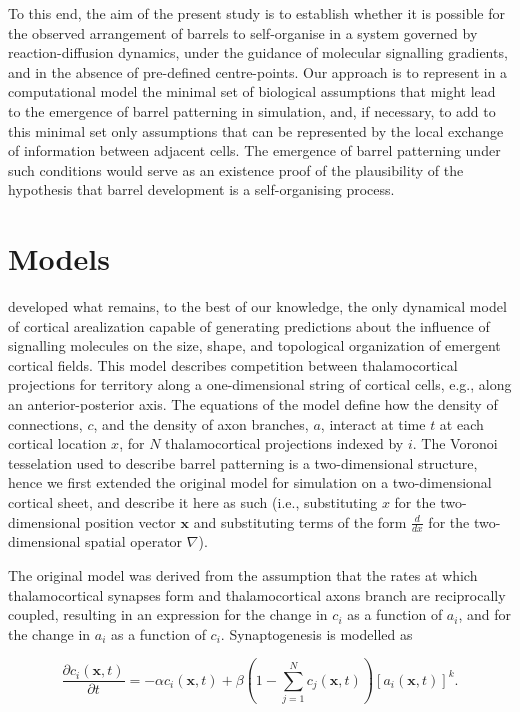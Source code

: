 \documentclass[a4paper,11pt]{article}
\newcommand{\mb}[1]{\mathbf{#1}}
\begin{document}
To this end, the aim of the present study is to establish whether it is possible for the observed arrangement of barrels to self-organise in a system governed by reaction-diffusion dynamics, under the guidance of molecular signalling gradients, and in the absence of pre-defined centre-points. Our approach is to represent in a computational model the minimal set of biological assumptions that might lead to the emergence of barrel patterning in simulation, and, if necessary, to add to this minimal set only assumptions that can be represented by the local exchange of information between adjacent cells. The emergence of barrel patterning under such conditions would serve as an existence proof of the plausibility of the hypothesis that barrel development is a self-organising process.

\section*{Models}

\cite{Karbowski2004} developed what remains, to the best of our knowledge, the only dynamical model of cortical arealization capable of generating predictions about the influence of signalling molecules on the size, shape, and topological organization of emergent cortical fields. This model describes competition between thalamocortical projections for territory along a one-dimensional string of cortical cells, e.g., along an anterior-posterior axis. The equations of the model define how the density of connections, $c$, and the density of axon branches, $a$, interact at time $t$ at each cortical location $x$, for $N$ thalamocortical projections indexed by $i$. The Voronoi tesselation used to describe barrel patterning is a two-dimensional structure, hence we first extended the original model for simulation on a two-dimensional cortical sheet, and describe it here as such (i.e., substituting $x$ for the two-dimensional position vector $\mb{x}$ and substituting terms of the form $\frac{d}{dx}$ for the two-dimensional spatial operator $\nabla$).

The original model was derived from the assumption that the rates at which thalamocortical synapses form and thalamocortical axons branch are reciprocally coupled, resulting in an expression for the change in $c_i$ as a function of $a_i$, and for the change in $a_i$ as a function of $c_i$. Synaptogenesis is modelled  as

\begin{equation} \label{eq:Karb2DExt_dc}
\frac{\partial c_i(\mb{x},t)}{\partial t} =-\alpha c_i(\mb{x},t) +\beta  \left(1 - \sum_{j=1}^{N} c_j(\mb{x}, t)\right)[a_i(\mb{x},t)]^k.
\end{equation}
\end{document}
